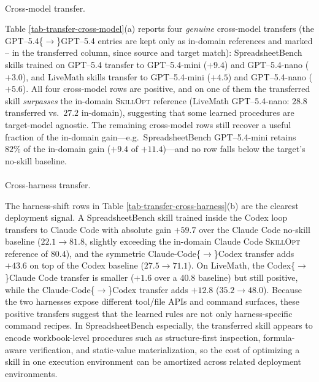 \documentclass[
]{article}
\makeatletter
\let\oldparagraph\paragraph
\renewcommand{\paragraph}{
    \@ifstar
      \xxxParagraphStar
      \xxxParagraphNoStar
  }
\newcommand{\xxxParagraphStar}[1]{\oldparagraph*{#1}\mbox{}}
\newcommand{\xxxParagraphNoStar}[1]{\oldparagraph{#1}\mbox{}}
\newcommand{\ourmethod}{\textsc{SkillOpt}\xspace}
\newcommand{\na}{--}
\makeatother
\begin{document}
\paragraph{Cross-model transfer.}\label{cross-model-transfer.}

Table \ref{tab-transfer-cross-model}(a) reports four \emph{genuine}
cross-model transfers (the GPT--5.4\{\(\to\)\}GPT--5.4 entries are kept
only as in-domain references and marked \na{} in the transferred column,
since source and target match): SpreadsheetBench skills trained on
GPT--5.4 transfer to GPT--5.4-mini (\(+9.4\)) and GPT--5.4-nano
(\(+3.0\)), and LiveMath skills transfer to GPT--5.4-mini (\(+4.5\)) and
GPT--5.4-nano (\(+5.6\)). All four cross-model rows are positive, and on
one of them the transferred skill \emph{surpasses} the in-domain
\ourmethod{} reference (LiveMath GPT--5.4-nano: \(28.8\) transferred
vs.~\(27.2\) in-domain), suggesting that some learned procedures are
target-model agnostic. The remaining cross-model rows still recover a
useful fraction of the in-domain gain---e.g.~SpreadsheetBench
GPT--5.4-mini retains \(82\%\) of the in-domain gain (\(+9.4\) of
\(+11.4\))---and no row falls below the target's no-skill baseline.

\paragraph{Cross-harness transfer.}\label{cross-harness-transfer.}

The harness-shift rows in Table \ref{tab-transfer-cross-harness}(b) are
the clearest deployment signal. A SpreadsheetBench skill trained inside
the Codex loop transfers to Claude Code with absolute gain \(+59.7\)
over the Claude Code no-skill baseline (\(22.1{\to}81.8\), slightly
exceeding the in-domain Claude Code \ourmethod{} reference of \(80.4\)),
and the symmetric Claude-Code\{\(\to\)\}Codex transfer adds \(+43.6\) on
top of the Codex baseline (\(27.5{\to}71.1\)). On LiveMath, the
Codex\{\(\to\)\}Claude Code transfer is smaller (\(+1.6\) over a
\(40.8\) baseline) but still positive, while the
Claude-Code\{\(\to\)\}Codex transfer adds \(+12.8\) (\(35.2{\to}48.0\)).
Because the two harnesses expose different tool/file APIs and command
surfaces, these positive transfers suggest that the learned rules are
not only harness-specific command recipes. In SpreadsheetBench
especially, the transferred skill appears to encode workbook-level
procedures such as structure-first inspection, formula-aware
verification, and static-value materialization, so the cost of
optimizing a skill in one execution environment can be amortized across
related deployment environments.
\end{document}
